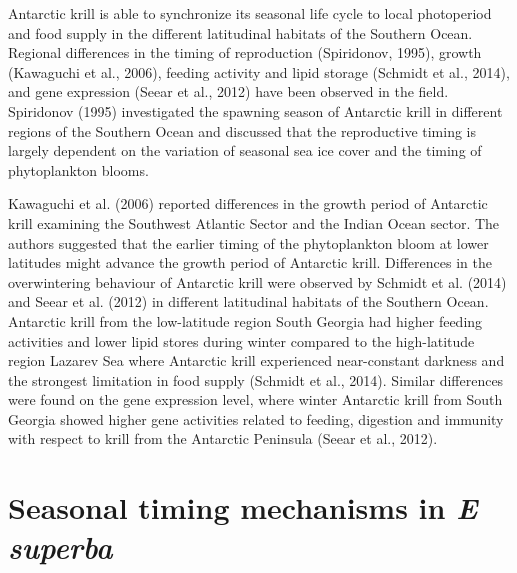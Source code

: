 Antarctic krill is able to synchronize its seasonal life cycle to local
photoperiod and food supply in the different latitudinal habitats of the
Southern Ocean. Regional differences in the timing of reproduction (Spiridonov,
1995), growth (Kawaguchi et al., 2006), feeding activity and lipid storage
(Schmidt et al., 2014), and gene expression (Seear et al., 2012) have been
observed in the field. Spiridonov (1995) investigated the spawning season of
Antarctic krill in different regions of the Southern Ocean and discussed that
the reproductive timing is largely dependent on the variation of  seasonal sea
ice cover and the timing of phytoplankton blooms. 

Kawaguchi et al. (2006) reported differences in the growth period of Antarctic
krill examining the Southwest Atlantic Sector and the Indian Ocean sector. The
authors suggested that the earlier timing of the phytoplankton bloom at lower
latitudes might advance the growth period of Antarctic krill. Differences in
the overwintering behaviour of Antarctic krill were observed by Schmidt et al.
(2014) and Seear et al. (2012) in different latitudinal habitats of the
Southern Ocean. Antarctic krill from the low-latitude region South Georgia had
higher feeding activities and lower lipid stores during winter compared to the
high-latitude region Lazarev Sea where Antarctic krill experienced
near-constant darkness and the strongest limitation in food supply (Schmidt et
al., 2014). Similar differences were found on the gene expression level, where
winter Antarctic krill from South Georgia showed higher gene activities related
to feeding, digestion and immunity with respect to krill from the Antarctic
Peninsula (Seear et al., 2012).

\section{Seasonal timing mechanisms in \textit{E superba}}


